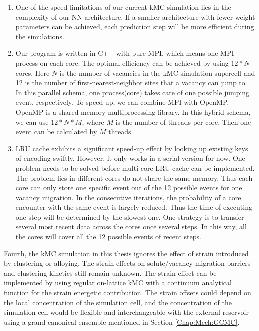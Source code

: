\begin{enumerate}

  \item One of the speed limitations of our current \ac{kMC} simulation lies in the complexity of our \ac{NN} architecture. If a smaller architecture with fewer weight parameters can be achieved, each prediction step will be more efficient during the simulations.

  \item Our program is written in C++ with pure \ac{MPI}, which means one \ac{MPI} process on each core. The optimal efficiency can be achieved by using $12*N$ cores. Here $N$ is the number of vacancies in the \ac{kMC} simulation supercell and 12 is the number of first-nearest-neighbor sites that a vacancy can jump to. In this parallel schema, one process(core) takes care of one possible jumping event, respectively. To speed up, we can combine \ac{MPI} with OpenMP. OpenMP is a shared memory multiprocessing library\cite{dagum1998openmp}. In this hybrid schema, we can use $12*N*M$, where $M$ is the number of threads per core. Then one event can be calculated by $M$ threads.

  \item \ac{LRU} cache exhibits a significant speed-up effect by looking up existing keys of encoding swiftly. However, it only works in a serial version for now. One problem needs to be solved before multi-core \ac{LRU} cache can be implemented. The problem lies in different cores do not share the same memory. Thus each core can only store one specific event out of the 12 possible events for one vacancy migration. In the consecutive iterations, the probability of a core encounter with the same event is largely reduced. Thus the time of executing one step will be determined by the slowest one. One strategy is to transfer several most recent data across the cores once several steps. In this way, all the cores will cover all the 12 possible events of recent steps.

\end{enumerate}

Fourth, the \ac{kMC} simulation in this thesis ignores the effect of strain introduced by clustering or alloying. The strain effects on solute/vacancy migration barriers and clustering kinetics still remain unknown. The strain effect can be implemented by using regular on-lattice \ac{kMC} with a continuum analytical function for the strain energetic contribution. The strain offsets could depend on the local concentration of the simulation cell, and the concentration of the simulation cell would be flexible and interchangeable with the external reservoir using a grand canonical ensemble mentioned in Section \ref{Chap:Mech:GCMC}.

